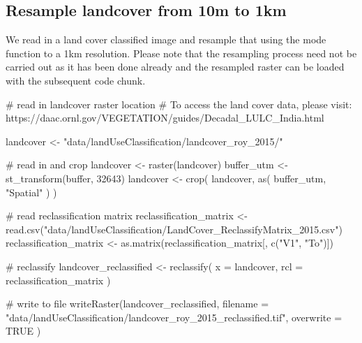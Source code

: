 \documentclass[
]{article}
\newenvironment{Shaded}{}{}
\newcommand{\CommentTok}[1]{\textcolor[rgb]{0.00,0.50,0.00}{#1}}
\newcommand{\DataTypeTok}[1]{#1}
\newcommand{\DecValTok}[1]{#1}
\newcommand{\KeywordTok}[1]{\textcolor[rgb]{0.00,0.00,1.00}{#1}}
\newcommand{\NormalTok}[1]{#1}
\newcommand{\OtherTok}[1]{\textcolor[rgb]{1.00,0.25,0.00}{#1}}
\newcommand{\StringTok}[1]{\textcolor[rgb]{0.00,0.50,0.50}{#1}}
\begin{document}
\hypertarget{resample-landcover-from-10m-to-1km}{%
\subsection{Resample landcover from 10m to 1km}\label{resample-landcover-from-10m-to-1km}}

We read in a land cover classified image and resample that using the mode function to a 1km resolution. Please note that the resampling process need not be carried out as it has been done already and the resampled raster can be loaded with the subsequent code chunk.

\begin{Shaded}
\begin{Highlighting}[]
\CommentTok{# read in landcover raster location}
\CommentTok{# To access the land cover data, please visit: https://daac.ornl.gov/VEGETATION/guides/Decadal_LULC_India.html}

\NormalTok{landcover <-}\StringTok{ "data/landUseClassification/landcover_roy_2015/"}

\CommentTok{# read in and crop}
\NormalTok{landcover <-}\StringTok{ }\KeywordTok{raster}\NormalTok{(landcover)}
\NormalTok{buffer_utm <-}\StringTok{ }\KeywordTok{st_transform}\NormalTok{(buffer, }\DecValTok{32643}\NormalTok{)}
\NormalTok{landcover <-}\StringTok{ }\KeywordTok{crop}\NormalTok{(}
\NormalTok{  landcover,}
  \KeywordTok{as}\NormalTok{(}
\NormalTok{    buffer_utm,}
    \StringTok{"Spatial"}
\NormalTok{  )}
\NormalTok{)}

\CommentTok{# read reclassification matrix}
\NormalTok{reclassification_matrix <-}\StringTok{ }\KeywordTok{read.csv}\NormalTok{(}\StringTok{"data/landUseClassification/LandCover_ReclassifyMatrix_2015.csv"}\NormalTok{)}
\NormalTok{reclassification_matrix <-}\StringTok{ }\KeywordTok{as.matrix}\NormalTok{(reclassification_matrix[, }\KeywordTok{c}\NormalTok{(}\StringTok{"V1"}\NormalTok{, }\StringTok{"To"}\NormalTok{)])}

\CommentTok{# reclassify}
\NormalTok{landcover_reclassified <-}\StringTok{ }\KeywordTok{reclassify}\NormalTok{(}
  \DataTypeTok{x =}\NormalTok{ landcover,}
  \DataTypeTok{rcl =}\NormalTok{ reclassification_matrix}
\NormalTok{)}

\CommentTok{# write to file}
\KeywordTok{writeRaster}\NormalTok{(landcover_reclassified,}
  \DataTypeTok{filename =} \StringTok{"data/landUseClassification/landcover_roy_2015_reclassified.tif"}\NormalTok{,}
  \DataTypeTok{overwrite =} \OtherTok{TRUE}
\NormalTok{)}


\end{Highlighting}
\end{Shaded}
\end{document}
